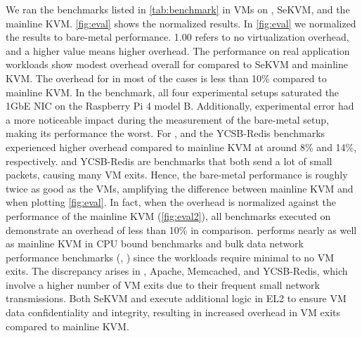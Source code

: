 We ran the benchmarks listed in \autoref{tab:benchmark} in VMs on
\rustsec{}, SeKVM, and the mainline KVM. \autoref{fig:eval} shows the normalized
results. In \autoref{fig:eval} we normalized the results to bare-metal
performance. 1.00 refers to no virtualization overhead, and
a higher value means higher overhead. The performance on real application
workloads show modest overhead overall for \rustsec{} compared to SeKVM and
mainline KVM. The overhead for \rustsec{} in most of the cases is less than
10\% compared to mainline KVM.
In the  benchmark, all four experimental setups saturated the
1GbE NIC on the Raspberry Pi 4 model B. Additionally, experimental error had a
more noticeable impact during the measurement of the bare-metal setup, making
its performance the worst.
For \rustsec{},  and the YCSB-Redis benchmarks experienced higher
overhead compared to mainline KVM at around 8\% and 14\%, respectively.
 and YCSB-Redis are benchmarks that both send a lot of small
packets, causing many VM exits. Hence, the bare-metal performance
is roughly twice as good as the VMs, amplifying the difference between mainline
KVM and \rustsec{} when plotting \autoref{fig:eval}.
In fact, when the overhead is normalized against the performance of the
mainline KVM (\autoref{fig:eval2}), all benchmarks executed on \rustsec{}
demonstrate an overhead of less than 10\% in comparison.
\rustsec{} performs nearly as well as mainline KVM in
CPU bound benchmarks and bulk data network performance benchmarks
(, ) since
the workloads require minimal to no VM exits.
The discrepancy arises in , Apache, Memcached,
and YCSB-Redis, which involve a higher number of VM exits due to their frequent
small network transmissions. Both SeKVM and \rustsec{} execute additional logic
in EL2 to ensure VM data confidentiality and integrity, resulting in increased
overhead in VM exits compared to mainline KVM.

